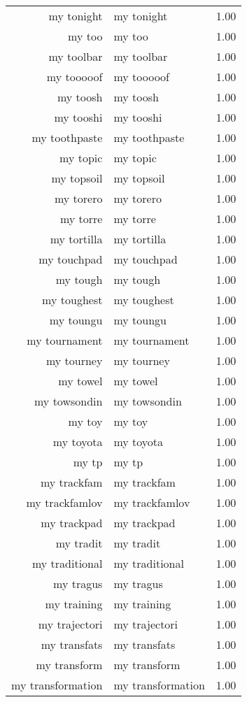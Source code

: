 \begin{table}[ht]
\begin{tabular}{rlr}
  my tonight & my tonight & 1.00 \\ 
  my too & my too & 1.00 \\ 
  my toolbar & my toolbar & 1.00 \\ 
  my tooooof & my tooooof & 1.00 \\ 
  my toosh & my toosh & 1.00 \\ 
  my tooshi & my tooshi & 1.00 \\ 
  my toothpaste & my toothpaste & 1.00 \\ 
  my topic & my topic & 1.00 \\ 
  my topsoil & my topsoil & 1.00 \\ 
  my torero & my torero & 1.00 \\ 
  my torre & my torre & 1.00 \\ 
  my tortilla & my tortilla & 1.00 \\ 
  my touchpad & my touchpad & 1.00 \\ 
  my tough & my tough & 1.00 \\ 
  my toughest & my toughest & 1.00 \\ 
  my toungu & my toungu & 1.00 \\ 
  my tournament & my tournament & 1.00 \\ 
  my tourney & my tourney & 1.00 \\ 
  my towel & my towel & 1.00 \\ 
  my towsondin & my towsondin & 1.00 \\ 
  my toy & my toy & 1.00 \\ 
  my toyota & my toyota & 1.00 \\ 
  my tp & my tp & 1.00 \\ 
  my trackfam & my trackfam & 1.00 \\ 
  my trackfamlov & my trackfamlov & 1.00 \\ 
  my trackpad & my trackpad & 1.00 \\ 
  my tradit & my tradit & 1.00 \\ 
  my traditional & my traditional & 1.00 \\ 
  my tragus & my tragus & 1.00 \\ 
  my training & my training & 1.00 \\ 
  my trajectori & my trajectori & 1.00 \\ 
  my transfats & my transfats & 1.00 \\ 
  my transform & my transform & 1.00 \\ 
  my transformation & my transformation & 1.00 \\ 

\end{tabular}
\end{table}
